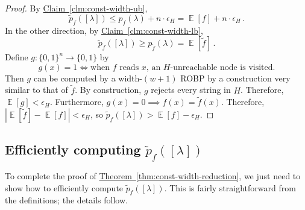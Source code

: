 \documentclass[11pt]{article}
\numberwithin{equation}{section}
\theoremstyle{definition}
\theoremstyle{plain}
\newcommand{\expref}[2]{\hyperref[#2]{#1~\ref{#2}}}
\DeclareMathOperator*{\ExpVal}{\mathbb{E}}
\begin{document}
\begin{proof}
By \expref{Claim}{clm:const-width-ub},
$$
\widetilde{p}_f([\lambda]) \leq p_f(\lambda) + n \cdot \epsilon_H = \ExpVal[f] + n \cdot \epsilon_H\,.
$$
In the other direction, by \expref{Claim}{clm:const-width-lb},
$$
\widetilde{p}_f([\lambda]) \geq p_{\widetilde{f}}(\lambda) = \ExpVal[\widetilde{f}]\,.
$$
Define $g \colon \{0, 1\}^n \to \{0, 1\}$ by
$$
g(x) = 1 \iff \text{when $f$ reads $x$, an $H$-unreachable node is visited}.
$$
Then $g$ can be computed by a width-$(w + 1)$ ROBP by a construction very similar to that of $\widetilde{f}$. By construction, $g$ rejects every string in $H$. Therefore, $\ExpVal[g] < \epsilon_H$. Furthermore, $g(x) = 0 \implies f(x) = \widetilde{f}(x)$. Therefore, $|\ExpVal[\widetilde{f}] - \ExpVal[f]| < \epsilon_H$, so $\widetilde{p}_f([\lambda]) > \ExpVal[f] - \epsilon_H$.
\end{proof}


\subsection{Efficiently computing $\widetilde{p}_f([\lambda])$} \label{sec:const-width-efficiency}

To complete the proof of \expref{Theorem}{thm:const-width-reduction}, we just need to show how to efficiently compute $\widetilde{p}_f([\lambda])$. This is fairly straightforward from the definitions; the details follow.
\end{document}
